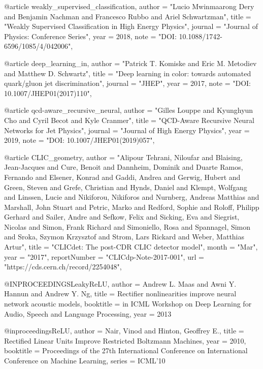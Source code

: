 @article{
    weakly_supervised_classification,
    author  = "Lucio Mwinmaarong Dery and Benjamin Nachman and Francesco Rubbo and Ariel Schwartzman",
    title   = "Weakly Supervised Classification in High Energy Physics",
    journal = "Journal of Physics: Conference Series",
    year    = 2018,
	note    = "DOI: 10.1088/1742-6596/1085/4/042006",
}

@article{
    deep_learning_in,
    author  = "Patrick T. Komiske and Eric M. Metodiev and Matthew D. Schwartz",
    title   = "Deep learning in color: towards automated quark/gluon jet discrimination",
    journal = "JHEP",
    year    = 2017,
    note    = "DOI: 10.1007/JHEP01(2017)110",
}

@article{
    qcd-aware_recursive_neural,
    author  = "Gilles Louppe and Kyunghyun Cho and Cyril Becot and Kyle Cranmer",
    title   = "QCD-Aware Recursive Neural Networks for Jet Physics",
    journal = "Journal of High Energy Physics",
    year    = 2019,
	note    = "DOI: 10.1007/JHEP01(2019)057",
}

@article{
    CLIC_geometry,
    author  = "Alipour Tehrani, Niloufar and Blaising, Jean-Jacques and Cure, Benoit and Dannheim, Dominik and Duarte Ramos, Fernando and Elsener, Konrad and Gaddi, Andrea and Gerwig, Hubert and Green, Steven and Grefe, Christian and Hynds, Daniel and Klempt, Wolfgang and Linssen, Lucie and Nikiforou, Nikiforos and Nurnberg, Andreas Matthias and Marshall, John Stuart and Petric, Marko and Redford, Sophie and Roloff, Philipp Gerhard and Sailer, Andre and Sefkow, Felix and Sicking, Eva and Siegrist, Nicolas and Simon, Frank Richard and Simoniello, Rosa and Spannagel, Simon and Sroka, Szymon Krzysztof and Strom, Lars Rickard and Weber, Matthias Artur",
    title   = "{CLICdet: The post-CDR CLIC detector model}",
    month   = "Mar",
    year    = "2017",
    reportNumber    = "CLICdp-Note-2017-001",
    url     = "https://cds.cern.ch/record/2254048",
}

@INPROCEEDINGS{LeakyReLU,
    author = {Andrew L. Maas and Awni Y. Hannun and Andrew Y. Ng},
    title = {Rectifier nonlinearities improve neural network acoustic models},
    booktitle = {in ICML Workshop on Deep Learning for Audio, Speech and Language Processing},
    year = {2013}
}

@inproceedings{ReLU, 
    author = {Nair, Vinod and Hinton, Geoffrey E.}, 
    title = {Rectified Linear Units Improve Restricted Boltzmann Machines}, year = {2010}, 
    booktitle = {Proceedings of the 27th International Conference on International Conference on Machine Learning}, 
    series = {ICML’10} 
}

